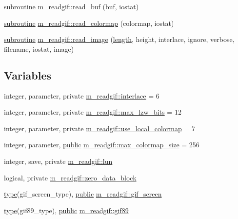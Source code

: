 \begin{DoxyCompactItemize}
\item 
\hyperlink{M__stopwatch_83_8txt_acfbcff50169d691ff02d4a123ed70482}{subroutine} \hyperlink{namespacem__readgif_a272a4dbcc1419d3d103db4c50b757805}{m\+\_\+readgif\+::read\+\_\+buf} (buf, iostat)
\item 
\hyperlink{M__stopwatch_83_8txt_acfbcff50169d691ff02d4a123ed70482}{subroutine} \hyperlink{namespacem__readgif_aabaf13dcb1e665b2524049e5661ca4b6}{m\+\_\+readgif\+::read\+\_\+colormap} (colormap, iostat)
\item 
\hyperlink{M__stopwatch_83_8txt_acfbcff50169d691ff02d4a123ed70482}{subroutine} \hyperlink{namespacem__readgif_a4af978d944dbefb3ddeb81cd8c54d0f9}{m\+\_\+readgif\+::read\+\_\+image} (\hyperlink{M__stopwatch_83_8txt_a04ed5ef37abacfa36a856b5f30376485}{length}, height, interlace, ignore, verbose, filename, iostat, image)
\end{DoxyCompactItemize}
\subsection*{Variables}
\begin{DoxyCompactItemize}
\item 
integer, parameter, private \hyperlink{namespacem__readgif_af71b0131b0327843ab00d56288f1e4a3}{m\+\_\+readgif\+::interlace} = 6
\item 
integer, parameter, private \hyperlink{namespacem__readgif_a42041a4cc2179d606ca9a1df44a797fe}{m\+\_\+readgif\+::max\+\_\+lzw\+\_\+bits} = 12
\item 
integer, parameter, private \hyperlink{namespacem__readgif_abfef407c9bbae736ddf82dd2f5cc0dbc}{m\+\_\+readgif\+::use\+\_\+local\+\_\+colormap} = 7
\item 
integer, parameter, \hyperlink{M__stopwatch_83_8txt_a2f74811300c361e53b430611a7d1769f}{public} \hyperlink{namespacem__readgif_a6bce6231298ac3b8c0fe89169eacf790}{m\+\_\+readgif\+::max\+\_\+colormap\+\_\+size} = 256
\item 
integer, save, private \hyperlink{namespacem__readgif_ae5e05cba63ef3a16c27f9935d6c2a24d}{m\+\_\+readgif\+::lun}
\item 
logical, private \hyperlink{namespacem__readgif_a3d4f20ed4d02e7e260b5e0bcae642ddd}{m\+\_\+readgif\+::zero\+\_\+data\+\_\+block}
\item 
\hyperlink{stop__watch_83_8txt_a70f0ead91c32e25323c03265aa302c1c}{type}(gif\+\_\+screen\+\_\+type), \hyperlink{M__stopwatch_83_8txt_a2f74811300c361e53b430611a7d1769f}{public} \hyperlink{namespacem__readgif_a6253fc469a2750e1d59bc498bca3d6eb}{m\+\_\+readgif\+::gif\+\_\+screen}
\item 
\hyperlink{stop__watch_83_8txt_a70f0ead91c32e25323c03265aa302c1c}{type}(gif89\+\_\+type), \hyperlink{M__stopwatch_83_8txt_a2f74811300c361e53b430611a7d1769f}{public} \hyperlink{namespacem__readgif_a1d5a3f008ce6a2b13029a0977dba1aa1}{m\+\_\+readgif\+::gif89}
\end{DoxyCompactItemize}
